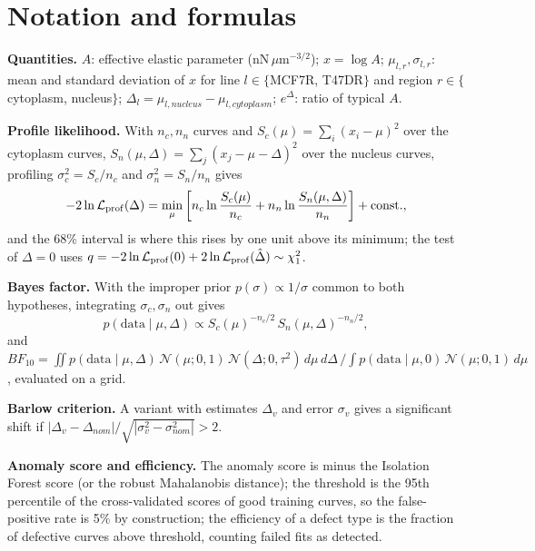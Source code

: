 \documentclass[reprint,nofootinbib,amsmath,amssymb,aps,floatfix]{revtex4-2}
\begin{document}
\appendix
\section{Notation and formulas}\label{app:notation}
\textbf{Quantities.} $A$: effective elastic parameter (nN\,$\mu$m$^{-3/2}$); $x=\log A$; $\mu_{l,r},\sigma_{l,r}$: mean and standard deviation of $x$ for
line $l\in\{$MCF7R, T47DR$\}$ and region $r\in\{$cytoplasm, nucleus$\}$; $\Delta_l=\mu_{l,nucleus}-\mu_{l,cytoplasm}$; $e^{\Delta}$: ratio of typical $A$.

\textbf{Profile likelihood.} With $n_c,n_n$ curves and $S_c(\mu)=\sum_i(x_i-\mu)^2$ over the cytoplasm curves, $S_n(\mu,\Delta)=\sum_j(x_j-\mu-\Delta)^2$ over the nucleus curves,
profiling $\sigma_c^2=S_c/n_c$ and $\sigma_n^2=S_n/n_n$ gives
\begin{equation}
-2\ln\mathcal L_{\rm prof}(\Delta)=\min_{\mu}\left[n_c\ln\frac{S_c(\mu)}{n_c}+n_n\ln\frac{S_n(\mu,\Delta)}{n_n}\right]+\text{const.},
\end{equation}
and the 68\% interval is where this rises by one unit above its minimum; the test of $\Delta=0$ uses $q=-2\ln\mathcal L_{\rm prof}(0)+2\ln\mathcal L_{\rm prof}(\hat\Delta)\sim\chi^2_1$.

\textbf{Bayes factor.} With the improper prior $p(\sigma)\propto1/\sigma$ common to both hypotheses, integrating $\sigma_c,\sigma_n$ out gives
\begin{equation}
p(\text{data}\mid\mu,\Delta)\propto S_c(\mu)^{-n_c/2}\,S_n(\mu,\Delta)^{-n_n/2},
\end{equation}
and $BF_{10}=\iint p(\text{data}\mid\mu,\Delta)\,\mathcal N(\mu;0,1)\,\mathcal N(\Delta;0,\tau^2)\,d\mu\,d\Delta\,/\!\int p(\text{data}\mid\mu,0)\,\mathcal N(\mu;0,1)\,d\mu$,
evaluated on a grid.

\textbf{Barlow criterion.} A variant with estimates $\Delta_v$ and error $\sigma_v$ gives a significant shift if $|\Delta_v-\Delta_{nom}|/\sqrt{|\sigma_v^2-\sigma_{nom}^2|}>2$.

\textbf{Anomaly score and efficiency.} The anomaly score is minus the Isolation Forest score (or the robust Mahalanobis distance); the threshold is the 95th percentile of the cross-validated scores of good
training curves, so the false-positive rate is 5\% by construction; the efficiency of a defect type is the fraction of defective curves above threshold, counting failed fits as detected.


\end{document}
